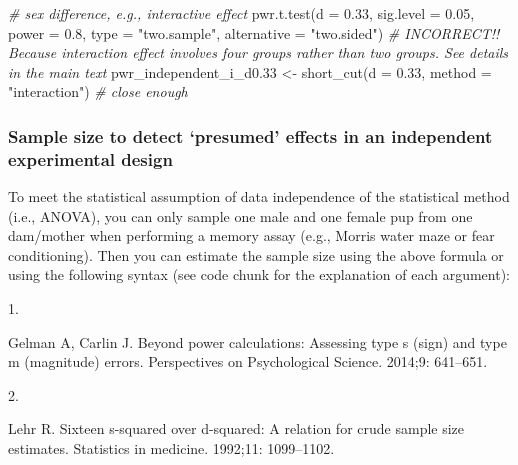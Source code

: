\documentclass[
]{article}
\newenvironment{Shaded}{\begin{snugshade}}{\end{snugshade}}
\newcommand{\AttributeTok}[1]{\textcolor[rgb]{0.77,0.63,0.00}{#1}}
\newcommand{\CommentTok}[1]{\textcolor[rgb]{0.56,0.35,0.01}{\textit{#1}}}
\newcommand{\FloatTok}[1]{\textcolor[rgb]{0.00,0.00,0.81}{#1}}
\newcommand{\FunctionTok}[1]{\textcolor[rgb]{0.00,0.00,0.00}{#1}}
\newcommand{\NormalTok}[1]{#1}
\newcommand{\OtherTok}[1]{\textcolor[rgb]{0.56,0.35,0.01}{#1}}
\newcommand{\StringTok}[1]{\textcolor[rgb]{0.31,0.60,0.02}{#1}}
\newlength{\cslhangindent}
\newlength{\csllabelwidth}
\newlength{\cslentryspacingunit} %
\newenvironment{CSLReferences}[2] %
 {%
  \setlength{\parindent}{0pt}
  \ifodd #1
  \let\oldpar\par
  \def\par{\hangindent=\cslhangindent\oldpar}
  \fi
  \setlength{\parskip}{#2\cslentryspacingunit}
 }%
 {}
\newcommand{\CSLLeftMargin}[1]{\parbox[t]{\csllabelwidth}{#1}}
\newcommand{\CSLRightInline}[1]{\parbox[t]{\linewidth - \csllabelwidth}{#1}\break}
\begin{document}
\begin{Shaded}
\begin{Highlighting}[]
\CommentTok{\# sex difference, e.g., interactive effect}
\FunctionTok{pwr.t.test}\NormalTok{(}\AttributeTok{d =} \FloatTok{0.33}\NormalTok{, }\AttributeTok{sig.level =} \FloatTok{0.05}\NormalTok{, }\AttributeTok{power =} \FloatTok{0.8}\NormalTok{, }\AttributeTok{type =} \StringTok{"two.sample"}\NormalTok{, }\AttributeTok{alternative =} \StringTok{"two.sided"}\NormalTok{)  }\CommentTok{\# INCORRECT!! Because interaction effect involves four groups rather than two groups. See details in the main text}
\NormalTok{pwr\_independent\_i\_d0}\FloatTok{.33} \OtherTok{\textless{}{-}} \FunctionTok{short\_cut}\NormalTok{(}\AttributeTok{d =} \FloatTok{0.33}\NormalTok{, }\AttributeTok{method =} \StringTok{"interaction"}\NormalTok{)  }\CommentTok{\# close enough}
\end{Highlighting}
\end{Shaded}

\hypertarget{sample-size-to-detect-presumed-effects-in-an-independent-experimental-design}{%
\subsubsection{Sample size to detect `presumed' effects in an
independent experimental
design}\label{sample-size-to-detect-presumed-effects-in-an-independent-experimental-design}}

To meet the statistical assumption of data independence of the
statistical method (i.e., ANOVA), you can only sample one male and one
female pup from one dam/mother when performing a memory assay (e.g.,
Morris water maze or fear conditioning). Then you can estimate the
sample size using the above formula or using the following syntax (see
code chunk for the explanation of each argument):

\hypertarget{refs}{}
\begin{CSLReferences}{0}{0}
\leavevmode{}%
\CSLLeftMargin{1. }
\CSLRightInline{Gelman A, Carlin J. Beyond power calculations: Assessing
type s (sign) and type m (magnitude) errors. Perspectives on
Psychological Science. 2014;9: 641--651. }

\leavevmode{}%
\CSLLeftMargin{2. }
\CSLRightInline{Lehr R. Sixteen s-squared over d-squared: A relation for
crude sample size estimates. Statistics in medicine. 1992;11:
1099--1102. }

\end{CSLReferences}
\end{document}
